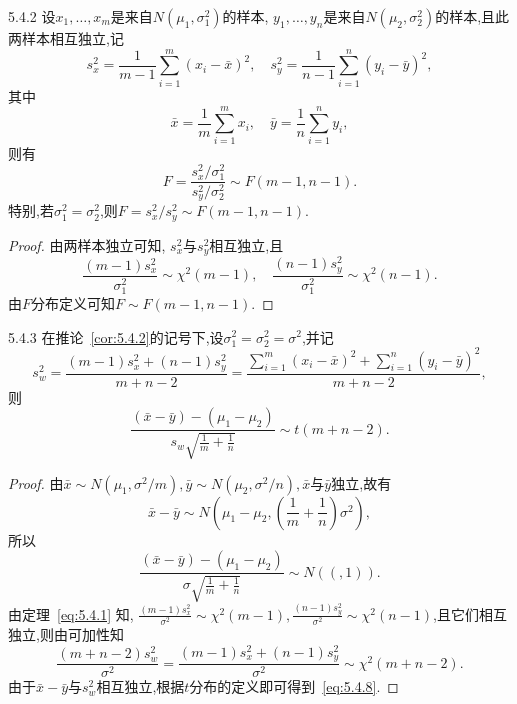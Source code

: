 \begin{corollary}{}{5.4.2}
设$x_1,\dotsc,x_m$是来自$N(\mu_1,\sigma_1^2)$的样本, $y_1,\dotsc,y_n$是来自$N(\mu_2,\sigma_2^2)$的样本,且此两样本相互独立,记
\[s_x^2=\frac1{m-1}\sum_{i=1}^m(x_i-\bar x)^2,\quad s_y^2=\frac1{n-1}\sum_{i=1}^n
(y_i-\bar y)^2,\]
其中
\[\bar x=\frac1m\sum_{i=1}^m x_i,\quad \bar y=\frac1n\sum_{i=1}^ny_i,\]
则有
\begin{equation}\label{eq5.4.7}
F=\frac{s_x^2/\sigma_1^2}{s_y^2/\sigma_2^2}\sim F(m-1,n-1).
\end{equation}
特别,若$\sigma_1^2=\sigma_2^2$,则$F=s_x^2/s_y^2\sim F(m-1,n-1)$.
\end{corollary}
\begin{proof}
由两样本独立可知, $s_x^2$与$s_y^2$相互独立,且
\[\frac{(m-1)s_x^2}{\sigma_1^2}\sim\chi^2(m-1),\quad
\frac{(n-1)s_y^2}{\sigma_1^2}\sim\chi^2(n-1).\]
由$F$分布定义可知$F\sim F(m-1,n-1)$.
\end{proof}
\begin{corollary}{}{5.4.3}
在推论~\ref{cor:5.4.2}的记号下,设$\sigma_1^2=\sigma_2^2=\sigma^2$,并记
\[
s_{w}^{2}=\frac{\left( m-1 \right) s_{x}^{2}+\left( n-1 \right) s_{y}^{2}}{m+n-2}=\frac{\sum_{i=1}^m{\left( x_i-\bar{x} \right) ^2}+\sum_{i=1}^n{\left( y_i-\bar{y} \right) ^2}}{m+n-2},
\]
则
\begin{equation}\label{eq:5.4.8}
\frac{\left( \bar{x}-\bar{y} \right) -\left( \mu _1-\mu _2 \right)}{s_w\sqrt{\frac{1}{m}+\frac{1}{n}}}\sim t\left( m+n-2 \right).
\end{equation}
\end{corollary}
\begin{proof}
由$\bar x\sim N(\mu_1,\sigma^2/m),\bar y\sim N(\mu_2,\sigma^2/n),\bar x$与$\bar y$独立,故有
\[\bar x-\bar y\sim N\left(\mu_1-\mu_2,\left(\frac1m+\frac1n\right)\sigma^2\right),\]
所以
\begin{equation}\label{eq:5.4.9}
\frac{\left( \bar{x}-\bar{y} \right) -\left( \mu _1-\mu _2 \right)}{\sigma \sqrt{\frac{1}{m}+\frac{1}{n}}}\sim N\left( \left( ,1 \right) \right).
\end{equation}
由定理~\ref{eq:5.4.1} 知, $\frac{(m-1)s_x^2}{\sigma^2}\sim\chi^2(m-1),
\frac{(n-1)s_y^2}{\sigma^2}\sim\chi^2(n-1)$,且它们相互独立,则由可加性知
\begin{equation}\label{eq:5.4.10}
\frac{\left( m+n-2 \right) s_{w}^{2}}{\sigma ^2}=\frac{\left( m-1 \right) s_{x}^{2}+\left( n-1 \right) s_{y}^{2}}{\sigma ^2}\sim \chi ^2\left( m+n-2 \right).
\end{equation}
由于$\bar x-\bar y$与$s_w^2$相互独立,根据$t$分布的定义即可得到~\eqref{eq:5.4.8}.
\end{proof}
